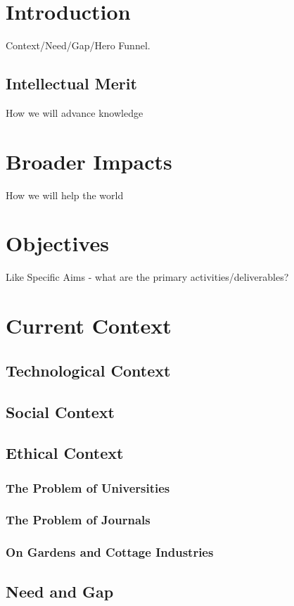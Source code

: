 \documentclass[11pt]{article}
\begin{document}
\pagestyle{empty} 
\setlength{\baselineskip}{12.6pt} 


\section{Introduction\label{sec:intro}}
Context/Need/Gap/Hero Funnel. \cite{matthis_retinal_2022}


\subsection{Intellectual Merit\label{sec:IM}}
How we will advance knowledge


\section{Broader Impacts\label{sec:BI}}
How we will help the world

\section{Objectives}
 Like Specific Aims - what are the primary activities/deliverables?

\newpage

\section{Current Context}
\subsection{Technological Context}
\subsection{Social Context}
\subsection{Ethical Context}
\subsubsection{The Problem of Universities}
\subsubsection{The Problem of Journals}
\subsubsection{On Gardens and Cottage Industries}
\subsection{Need and Gap}

\newpage
\printbibliography
\end{document}
